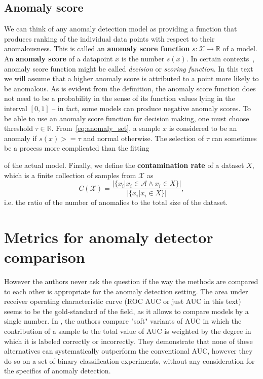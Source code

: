 \subsection{Anomaly score}
We can think of any anomaly detection model as providing a function that produces ranking of the individual data points with respect to their anomalousness. This is called an \textbf{anomaly score function} $s:\mathcal{X}\rightarrow\mathbb{R}$ of a model. An \textbf{anomaly score} of a datapoint $x$ is the number $s(x)$. In certain contexts~\cite{pedregosa2011scikit}, anomaly score function might be called \textit{decision }or \textit{scoring function}. In this text we will assume that a higher anomaly score is attributed to a point more likely to be anomalous. As is evident from the definition, the anomaly score function does not need to be a probability in the sense of its function values lying in the interval $\left[0,1\right]$ -- in fact, some models can produce negative anomaly scores. To be able to use an anomaly score function for decision making, one must choose threshold $\tau\in\mathbb{R}$. From~\eqref{eq:anomaly_set}, a sample $x$ is considered to be an anomaly if $s(x)>=\tau$ and normal otherwise. The selection of $\tau$ can sometimes be a process more complicated than the fitting


of the actual model. Finally, we define the \textbf{contamination rate} of a dataset $X$, which is a finite collection of samples from $\mathcal{X}$ as
\begin{equation}
C(\mathcal{X})=\frac{|\{x_{i}|x_{i}\in \mathcal{A} \wedge x_i \in X \}|}{|\{x_{i}|x_{i}\in X\}|},
\end{equation}
i.e. the ratio of the number of anomalies to the total size of the dataset.


\section{Metrics for anomaly detector comparison}

However the authors never ask the question if the way the methods are compared to each other is appropriate for the anomaly detection setting. The area under receiver operating characteristic curve (ROC AUC or just AUC in this text) seems to be the gold-standard of the field, as it allows to compare models by a single number. In \cite{vanderlooy2008critical}, the authors compare "soft" variants of AUC in which the contribution of a sample to the total value of AUC is weighted by the degree in which it is labeled correctly or incorrectly. They demonstrate that none of these alternatives can systematically outperform the conventional AUC, however they do so on a set of binary classification experiments, without any consideration for the specifics of anomaly detection.


